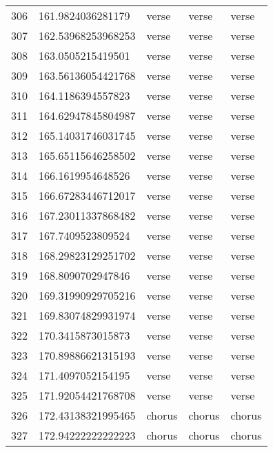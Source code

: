\begin{table}[]
\begin{tabular}{lllll}
    306  & 161.9824036281179  & verse        & verse           & verse          \\
    307  & 162.53968253968253 & verse        & verse           & verse          \\
    308  & 163.0505215419501  & verse        & verse           & verse          \\
    309  & 163.56136054421768 & verse        & verse           & verse          \\
    310  & 164.1186394557823  & verse        & verse           & verse          \\
    311  & 164.62947845804987 & verse        & verse           & verse          \\
    312  & 165.14031746031745 & verse        & verse           & verse          \\
    313  & 165.65115646258502 & verse        & verse           & verse          \\
    314  & 166.1619954648526  & verse        & verse           & verse          \\
    315  & 166.67283446712017 & verse        & verse           & verse          \\
    316  & 167.23011337868482 & verse        & verse           & verse          \\
    317  & 167.7409523809524  & verse        & verse           & verse          \\
    318  & 168.29823129251702 & verse        & verse           & verse          \\
    319  & 168.8090702947846  & verse        & verse           & verse          \\
    320  & 169.31990929705216 & verse        & verse           & verse          \\
    321  & 169.83074829931974 & verse        & verse           & verse          \\
    322  & 170.3415873015873  & verse        & verse           & verse          \\
    323  & 170.89886621315193 & verse        & verse           & verse          \\
    324  & 171.4097052154195  & verse        & verse           & verse          \\
    325  & 171.92054421768708 & verse        & verse           & verse          \\
    326  & 172.43138321995465 & chorus       & chorus          & chorus         \\
    327  & 172.94222222222223 & chorus       & chorus          & chorus         \\

\end{tabular}
\end{table}
